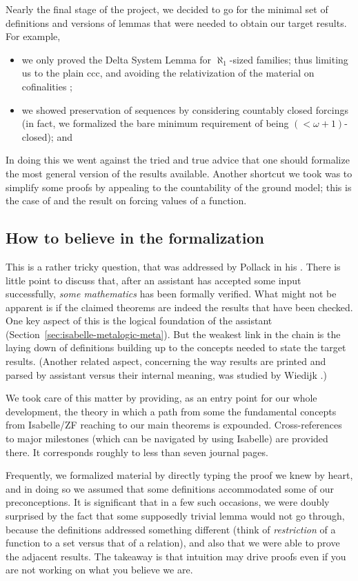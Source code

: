 Nearly the final stage of the project, we decided to go for the minimal
set of definitions and versions of lemmas that were needed to obtain
our target results. For example,
\begin{itemize}
\item
  we only proved the Delta System Lemma for $\aleph_1$-sized families;
  thus limiting us to the plain ccc, and avoiding the relativization
  of the material on cofinalities \cite{Delta_System_Lemma-AFP};
\item we showed preservation of sequences by considering countably
  closed forcings (in fact, we formalized the bare minimum requirement
  of being $(<\omega+1)$-closed); and
\end{itemize}
In doing this we went against the tried and
true advice that one should formalize the most general version of the
results available. Another shortcut we took was to
simplify some proofs by appealing to the countability of the ground
model; this is the case of
 and the result on forcing
values of a function.

\subsection{How to believe in the formalization}
This is a rather tricky question, that was addressed by Pollack in his
\cite{MR1686867}. There is little point to discuss that, after an
assistant has accepted some input successfully, \emph{some
mathematics} has been formally verified. What might not be apparent is
if the claimed theorems are indeed the results that have been
checked. One key aspect of this is the logical foundation of the
assistant (Section~\ref{sec:isabelle-metalogic-meta}). But the weakest
link in the chain is the laying down of definitions building up to the
concepts needed to state the target results. (Another related aspect,
concerning the way results are printed and parsed by assistant versus
their internal meaning, was studied by Wiedijk \cite{zbMATH06319597}.)

We took care of this matter by providing, as an entry point for our
whole development, the theory  in which a
path from some the fundamental concepts from Isabelle/ZF reaching to our main theorems
is expounded. Cross-references to major milestones (which can be
navigated by using Isabelle) are provided there. It
corresponds roughly to less than seven journal pages.

Frequently, we formalized material by directly typing the proof we
knew by heart, and in doing so we assumed that some definitions
accommodated some of our preconceptions.
It is significant that in a few such occasions, we were doubly
surprised by the fact that some supposedly trivial lemma would not go
through, because the definitions addressed something different (think
of \emph{restriction} of a function to a set versus that of a
relation), and also that we were able to prove the adjacent
results. The takeaway is that intuition may drive proofs
even if you are not working on what you believe we are.

